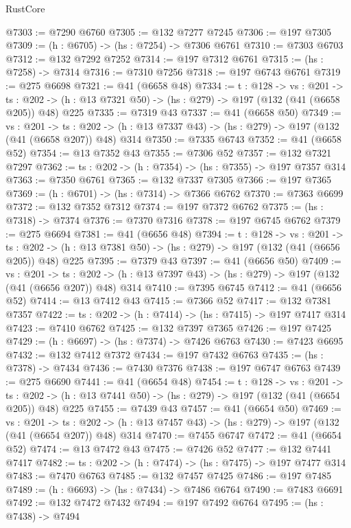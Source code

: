 \begin{lexlean}{RustCore}
\begin{coremodule}
@7303 := @7290 @6760
@7305 := @132 @7277 @7245
@7306 := @197 @7305
@7309 := (h : @6705) -> (hs : @7254) -> @7306 @6761
@7310 := @7303 @6703
@7312 := @132 @7292 @7252
@7314 := @197 @7312 @6761
@7315 := (hs : @7258) -> @7314
@7316 := @7310 @7256
@7318 := @197 @6743 @6761
@7319 := @275 @6698
@7321 := @41 (@6658 @48)
@7334 := {t : @128} ->
  {vs : @201} ->
  {ts : @202} -> (h : @13 @7321 @50) -> (hs : @279) -> @197 (@132 (@41 (@6658 @205)) @48) @225
@7335 := @7319 @43
@7337 := @41 (@6658 @50)
@7349 := {vs : @201} ->
  {ts : @202} -> (h : @13 @7337 @43) -> (hs : @279) -> @197 (@132 (@41 (@6658 @207)) @48) @314
@7350 := @7335 @6743
@7352 := @41 (@6658 @52)
@7354 := @13 @7352 @43
@7355 := @7306 @52
@7357 := @132 @7321 @7297
@7362 := {ts : @202} -> (h : @7354) -> (hs : @7355) -> @197 @7357 @314
@7363 := @7350 @6761
@7365 := @132 @7337 @7305
@7366 := @197 @7365
@7369 := (h : @6701) -> (hs : @7314) -> @7366 @6762
@7370 := @7363 @6699
@7372 := @132 @7352 @7312
@7374 := @197 @7372 @6762
@7375 := (hs : @7318) -> @7374
@7376 := @7370 @7316
@7378 := @197 @6745 @6762
@7379 := @275 @6694
@7381 := @41 (@6656 @48)
@7394 := {t : @128} ->
  {vs : @201} ->
  {ts : @202} -> (h : @13 @7381 @50) -> (hs : @279) -> @197 (@132 (@41 (@6656 @205)) @48) @225
@7395 := @7379 @43
@7397 := @41 (@6656 @50)
@7409 := {vs : @201} ->
  {ts : @202} -> (h : @13 @7397 @43) -> (hs : @279) -> @197 (@132 (@41 (@6656 @207)) @48) @314
@7410 := @7395 @6745
@7412 := @41 (@6656 @52)
@7414 := @13 @7412 @43
@7415 := @7366 @52
@7417 := @132 @7381 @7357
@7422 := {ts : @202} -> (h : @7414) -> (hs : @7415) -> @197 @7417 @314
@7423 := @7410 @6762
@7425 := @132 @7397 @7365
@7426 := @197 @7425
@7429 := (h : @6697) -> (hs : @7374) -> @7426 @6763
@7430 := @7423 @6695
@7432 := @132 @7412 @7372
@7434 := @197 @7432 @6763
@7435 := (hs : @7378) -> @7434
@7436 := @7430 @7376
@7438 := @197 @6747 @6763
@7439 := @275 @6690
@7441 := @41 (@6654 @48)
@7454 := {t : @128} ->
  {vs : @201} ->
  {ts : @202} -> (h : @13 @7441 @50) -> (hs : @279) -> @197 (@132 (@41 (@6654 @205)) @48) @225
@7455 := @7439 @43
@7457 := @41 (@6654 @50)
@7469 := {vs : @201} ->
  {ts : @202} -> (h : @13 @7457 @43) -> (hs : @279) -> @197 (@132 (@41 (@6654 @207)) @48) @314
@7470 := @7455 @6747
@7472 := @41 (@6654 @52)
@7474 := @13 @7472 @43
@7475 := @7426 @52
@7477 := @132 @7441 @7417
@7482 := {ts : @202} -> (h : @7474) -> (hs : @7475) -> @197 @7477 @314
@7483 := @7470 @6763
@7485 := @132 @7457 @7425
@7486 := @197 @7485
@7489 := (h : @6693) -> (hs : @7434) -> @7486 @6764
@7490 := @7483 @6691
@7492 := @132 @7472 @7432
@7494 := @197 @7492 @6764
@7495 := (hs : @7438) -> @7494

\end{coremodule}
\end{lexlean}
